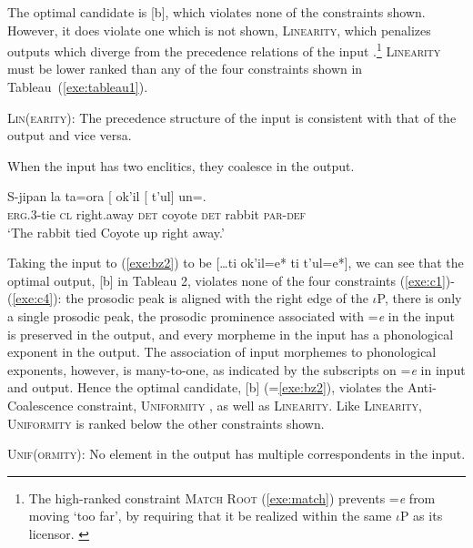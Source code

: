 \documentclass[output=paper,
modfonts
]{LSP/langsci}
\begin{document}
 \noindent
The optimal candidate is [b], which violates none of the constraints shown. However, it does violate one which is not shown, 
\textsc{Linearity}, which penalizes outputs which diverge from the precedence relations of the input \citep{mccarthy1995}.\footnote
{The high-ranked constraint \textsc{Match Root} (\ref{exe:match}) prevents =\emph{e} from moving `too far', by requiring that it be realized 
within the same $\iota$P as its licensor.
\label{footnote:matchroot}
}
\textsc{Linearity}
must be lower ranked than any of the four constraints shown in Tableau~(\ref{exe:tableau1}).
\begin{exe}
\ex \textsc{Lin(earity)}: The precedence structure of the input is consistent with that of the output and vice versa.
\label{exe:c5}
\end{exe}

When the input has two enclitics, they coalesce in the output. 
\begin{exe}
		\ex\label{exe:bz2}\bridgeoverex
		\gll S-jipan la ta=ora [ ok'il [ t'ul] un=.\\
		\textsc{erg.3}-tie \textsc{cl} right.away \textsc{det} coyote \textsc{det} rabbit  \textsc{par-def} \\
		\glt `The rabbit tied Coyote up right away.'  \citep[160]{laughlin1977} 
		\end{exe}
Taking the input to (\ref{exe:bz2}) to be [\dots ti ok'il=e* ti t'ul=e*], we can see that the optimal output,  [b] in Tableau 2, 
violates none of the four constraints (\ref{exe:c1})-(\ref{exe:c4}): the prosodic peak is aligned with the right edge of the $\iota$P, 
there is only a single prosodic peak, the prosodic prominence associated with =\emph{e} in the input is preserved in the output, and 
every morpheme in the input has a phonological exponent in the output. The association of input morphemes to phonological 
exponents, however, is many-to-one, as indicated by the subscripts on =\emph{e} in input and output.
Hence the optimal candidate, [b] (=\ref{exe:bz2}), violates the Anti-Coalescence constraint, \textsc{Uniformity} \citep{mccarthy1995}, 
as well as \textsc{Linearity}.
Like \textsc{Linearity}, \textsc{Uniformity} is ranked below the other constraints shown.
\begin{exe}
\ex \textsc{Unif(ormity)}: No element in the output has multiple correspondents in the input.
\label{exe:c6}
\end{exe}
\end{document}
